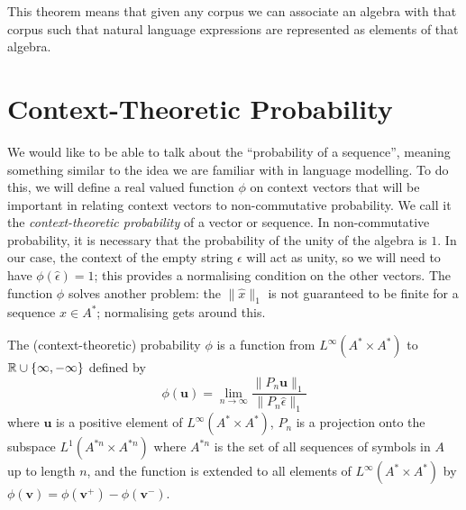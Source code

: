 \documentclass[11pt]{report}
\begin{document}
This theorem means that given any corpus we can associate an algebra with that corpus such that natural language expressions are represented as elements of that algebra. %

\section{Context-Theoretic Probability}

We would like to be able to talk about the ``probability of a sequence'', meaning something similar to the idea we are familiar with in language modelling. To do this, we will define a real valued function $\phi$ on context vectors that will be important in relating context vectors to non-commutative probability. We call it the \emph{context-theoretic probability} of a vector or sequence. In non-commutative probability, it is necessary that the probability of the unity of the algebra is $1$. In our case, the context of the empty string $\epsilon$ will act as unity, so we will need to have $\phi(\hat{\epsilon}) = 1$; this provides a normalising condition on the other vectors. The function $\phi$ solves another problem: the $\|\hat{x}\|_1$ is not guaranteed to be finite for a sequence $x \in A^*$; normalising gets around this.
\begin{defn}[Probability]
The (context-theoretic) probability $\phi$ is a function from $L^\infty(A^*\times A^*)$ to $\mathbb{R}\cup\{\infty,-\infty\}$ defined by
$$\phi(\mathbf{u}) = \lim_{n\rightarrow\infty} \frac{\|P_n\mathbf{u}\|_1}{\|P_n\hat{\epsilon}\|_1}$$
where $\mathbf{u}$ is a positive element of $L^\infty(A^*\times A^*)$, $P_n$ is a projection onto the subspace $L^1(A^{*n}\times A^{*n})$ where $A^{*n}$ is the set of all sequences of symbols in $A$ up to length $n$, and the function is extended to all elements of $L^\infty(A^*\times A^*)$ by $\phi(\mathbf{v}) = \phi(\mathbf{v}^+) - \phi(\mathbf{v}^-)$.
\end{defn}
\end{document}
